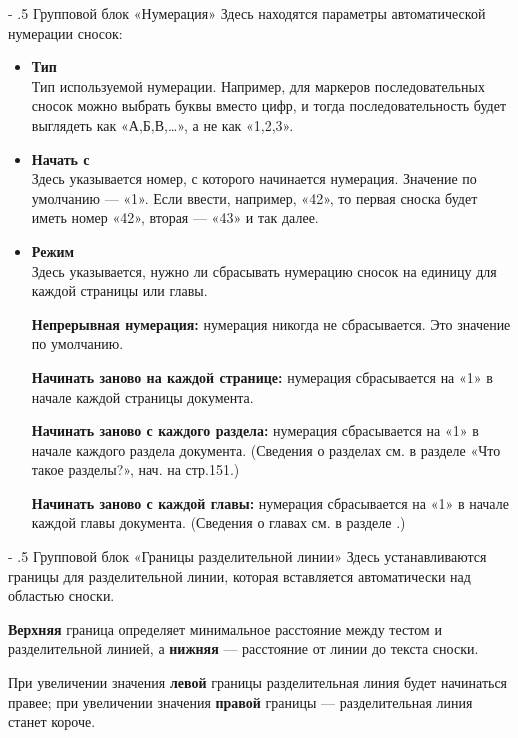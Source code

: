 ﻿\documentclass[a4paper,10pt]{article}
\makeatletter
\renewcommand\paragraph{%
   \@startsection{paragraph}{4}{0mm}%
      {-\baselineskip}%
      {.5\baselineskip}%
      {\normalfont\normalsize\bfseries}}
\makeatother
\begin{document}
\paragraph{Групповой блок «Нумерация»}
Здесь находятся параметры автоматической нумерации сносок:
\begin{itemize}
 \item \textbf{Тип}\\
 Тип используемой нумерации. Например, для маркеров последовательных сносок можно выбрать буквы вместо цифр, и тогда последовательность будет выглядеть как «А,Б,В,…», а не как «1,2,3».
 \item \textbf{Начать с}\\
 Здесь указывается номер, с которого начинается нумерация. Значение по умолчанию — «1». Если ввести, например, «42», то первая сноска будет иметь номер «42», вторая — «43» и так далее.
 \item \textbf{Режим}\\
 Здесь указывается, нужно ли сбрасывать нумерацию сносок на единицу для каждой страницы или главы.
 
 \textbf{Непрерывная нумерация:} нумерация никогда не сбрасывается. Это значение по умолчанию.
 
 \textbf{Начинать заново на каждой странице:} нумерация сбрасывается на «1» в начале каждой страницы документа.
 
 \textbf{Начинать заново с каждого раздела:} нумерация сбрасывается на «1» в начале каждого раздела документа. (Сведения о разделах см. в разделе «Что такое разделы?», нач. на стр.151.)
 
 \textbf{Начинать заново с каждой главы:} нумерация сбрасывается на «1» в начале каждой главы документа. (Сведения о главах см. в разделе .)
\end{itemize}

\paragraph{Групповой блок «Границы разделительной линии»}
Здесь устанавливаются границы для разделительной линии, которая вставляется автоматически над областью сноски.

\textbf{Верхняя} граница определяет минимальное расстояние между тестом и разделительной линией, а \textbf{нижняя} — расстояние от линии до текста сноски.

При увеличении значения \textbf{левой} границы разделительная линия будет начинаться правее; при увеличении значения \textbf{правой} границы — разделительная линия станет короче.
\end{document}
